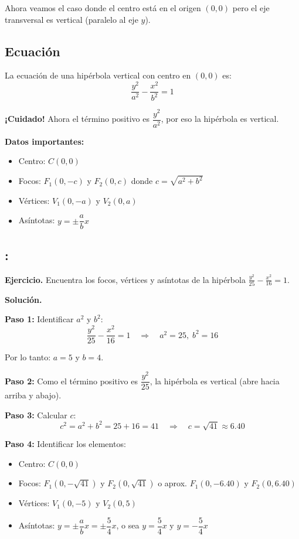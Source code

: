 \documentclass[12pt,a4paper]{article}
\begin{document}
	Ahora veamos el caso donde el centro está en el origen $(0,0)$ pero el eje transversal es vertical (paralelo al eje $y$).

	\subsection*{Ecuación}

	La ecuación de una hipérbola vertical con centro en $(0,0)$ es:
	\[
	\boxed{\frac{y^2}{a^2}-\frac{x^2}{b^2}=1}
	\]

	\textbf{¡Cuidado!} Ahora el término positivo es $\dfrac{y^2}{a^2}$, por eso la hipérbola es vertical.

	\textbf{Datos importantes:}
	\begin{itemize}
		\item Centro: $C(0,0)$
		\item Focos: $F_1(0,-c)$ y $F_2(0,c)$ donde $c=\sqrt{a^2+b^2}$
		\item Vértices: $V_1(0,-a)$ y $V_2(0,a)$
		\item Asíntotas: $y=\pm\dfrac{a}{b}x$
	\end{itemize}

	\subsection*{{\color{blue!40!red}{Ejemplo 2}}: \color{blue!80!black}{Hipérbola vertical con centro en el origen}}

	\textbf{Ejercicio.} Encuentra los focos, vértices y asíntotas de la hipérbola $\displaystyle\frac{y^2}{25}-\frac{x^2}{16}=1$.

	\bigskip

	\textbf{Solución.}

	\bigskip

	\textbf{Paso 1:} Identificar $a^2$ y $b^2$:
	\[
	\frac{y^2}{25}-\frac{x^2}{16}=1 \quad\Rightarrow\quad a^2=25,\;b^2=16
	\]

	Por lo tanto: $a=5$ y $b=4$.

	\textbf{Paso 2:} Como el término positivo es $\dfrac{y^2}{25}$, la hipérbola es vertical (abre hacia arriba y abajo).

	\textbf{Paso 3:} Calcular $c$:
	\[
	c^2=a^2+b^2=25+16=41 \quad\Rightarrow\quad c=\sqrt{41}\approx 6.40
	\]

	\textbf{Paso 4:} Identificar los elementos:
	\begin{itemize}
		\item Centro: $\boxed{C(0,0)}$
		\item Focos: $\boxed{F_1(0,-\sqrt{41})\text{ y }F_2(0,\sqrt{41})}$ o aprox. $F_1(0,-6.40)$ y $F_2(0,6.40)$
		\item Vértices: $\boxed{V_1(0,-5)\text{ y }V_2(0,5)}$
		\item Asíntotas: $y=\pm\dfrac{a}{b}x=\pm\dfrac{5}{4}x$, o sea $\boxed{y=\dfrac{5}{4}x\text{ y }y=-\dfrac{5}{4}x}$
	\end{itemize}
\end{document}
